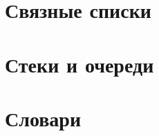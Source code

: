 \documentclass[12pt,a4paper]{report}
\begin{document}
\section{Связные списки}


\section{Стеки и очереди}


\section{Словари}
\end{document}
